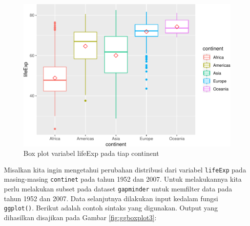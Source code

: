 \documentclass[]{book}
\newenvironment{Shaded}{\begin{snugshade}}{\end{snugshade}}
\newcommand{\KeywordTok}[1]{\textcolor[rgb]{0.13,0.29,0.53}{\textbf{#1}}}
\newcommand{\DataTypeTok}[1]{\textcolor[rgb]{0.13,0.29,0.53}{#1}}
\newcommand{\DecValTok}[1]{\textcolor[rgb]{0.00,0.00,0.81}{#1}}
\newcommand{\StringTok}[1]{\textcolor[rgb]{0.31,0.60,0.02}{#1}}
\newcommand{\OtherTok}[1]{\textcolor[rgb]{0.56,0.35,0.01}{#1}}
\newcommand{\OperatorTok}[1]{\textcolor[rgb]{0.81,0.36,0.00}{\textbf{#1}}}
\newcommand{\NormalTok}[1]{#1}
\begin{document}
\begin{figure}

{\centering \includegraphics[width=0.7\linewidth]{EnvStat_files/figure-latex/ggboxplot2-1} 

}

\caption{Box plot variabel lifeExp pada tiap continent}\label{fig:ggboxplot2}
\end{figure}

Misalkan kita ingin mengetahui perubahan distribusi dari variabel
\texttt{lifeExp} pada masing-masing \texttt{continet} pada tahun 1952
dan 2007. Untuk melakukannya kita perlu melakukan subset pada dataset
\texttt{gapminder} untuk memfilter data pada tahun 1952 dan 2007. Data
selanjutnya dilakukan input kedalam fungsi \texttt{ggplot()}. Berikut
adalah contoh sintaks yang digunakan. Output yang dihasilkan disajikan
pada Gambar \ref{fig:ggboxplot3}:

\begin{Shaded}
\end{Shaded}
\end{document}
